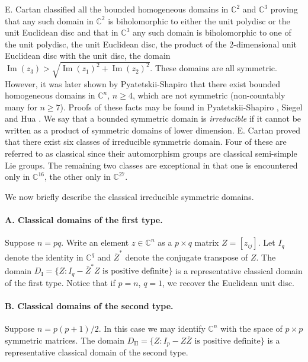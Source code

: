 E. Cartan \cite{bib:I:cartan-e:1} classified all the bounded homogeneous domains in $\mathbb C^2$ and $\mathbb C^3$ proving that any such domain in $\mathbb C^2$ is biholomorphic to either the unit polydisc or the unit Euclidean disc and that in $\mathbb C^3$ any such domain is biholomorphic to one of the unit polydisc, the unit Euclidean disc, the product of the 2-dimensional unit Euclidean disc with the unit disc, the domain $\operatorname{Im}(z_3)>\sqrt{\operatorname{Im}(z_1)^2+\operatorname{Im}(z_2)^2}$. These domains are all symmetric. However, it was later shown by Pyatetskii-Shapiro \cite{bib:I:pyatetskii-shapiro-i-i:1} that there exist bounded homogeneous domains in $\mathbb C^n$, $n\geq4$, which are not symmetric (non-countably many for $n\geq7$). Proofs of these facts may be found in Pyatetskii-Shapiro \cite{bib:I:pyatetskii-shapiro-i-i:1}, Siegel \cite{bib:I:siegel-c-l:2} and Hua \cite{bib:I:hua-l-k:1}.
We say that a bounded symmetric domain is \emph{irreducible} if it cannot be written as a product of symmetric domains of lower dimension. E. Cartan \cite{bib:I:cartan-e:1} proved that there exist six classes of irreducible symmetric domain. Four of these are referred to as classical since their automorphism groups are classical semi-simple Lie groups. The remaining two classes are exceptional in that one is encountered only in $\mathbb C^{16}$, the other only in $\mathbb C^{27}$.

We now briefly describe the classical irreducible symmetric domains.

\paragraph*{A. Classical domains of the first type.} Suppose $n=pq$. Write an element $z\in\mathbb C^n$ as a $p\times q$ matrix $Z=[z_{ij}]$. Let $I_q$ denote the identity in $\mathbb C^q$ and $\bar Z^*$ denote the conjugate transpose of $Z$. The domain $D_{\mathrm I}=\{Z:I_q-\bar Z^*Z\text{ is positive definite}\}$ is a representative classical domain of the first type. Notice that if $p=n$, $q=1$, we recover the Euclidean unit disc.

\paragraph*{B. Classical domains of the second type.} Suppose $n=p(p+1)/2$. In this case we may identify $\mathbb C^n$ with the space of $p\times p$ symmetric matrices. The domain $D_{\mathrm {II}}=\{Z:I_p-Z\bar Z\text{ is positive definite}\}$ is a representative classical domain of the second type.

